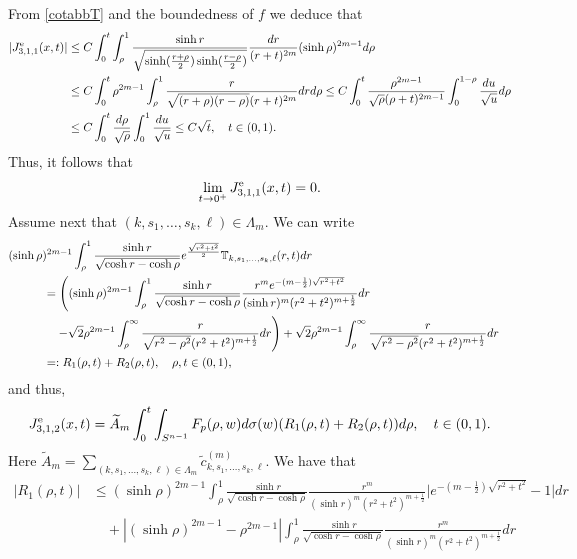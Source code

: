 \documentclass[a4paper,10pt, reqno]{amsart}
\theoremstyle{definition}
\theoremstyle{remark}
\numberwithin{equation}{section}
\begin{document}
{From \eqref{cotabbT} and the boundedness of $f$ we deduce that
\begin{align}\label{J311even}
    |J_{3,1,1}^{\rm e}(x,t)|&\leq C\int_0^t\int_\rho ^1\frac{\sinh r}{\sqrt{\sinh (\frac{r+\rho}{2})\sinh(\frac{r-\rho}{2})}}\frac{dr}{(r+t)^{2m}}(\sinh \rho )^{2m-1}d\rho\nonumber\\
    &\leq C\int_0^t\rho ^{2m-1}\int_\rho ^1\frac{r}{\sqrt{(r+\rho)(r-\rho)}(r+t)^{2m}}drd\rho\leq C\int_0^t\frac{\rho ^{2m-1}}{\sqrt{\rho}(\rho +t)^{2m-1}}\int_0^{1-\rho}\frac{du}{\sqrt{u}}d\rho\nonumber\\
    &\leq C\int_0^t\frac{d\rho}{\sqrt{\rho}}\int_0^1\frac{du}{\sqrt{u}}\leq C\sqrt{t},\quad t\in (0,1).
\end{align}
Thus, it follows that
$$
\lim_{t\rightarrow 0^+}J_{3,1,1}^{\rm e}(x,t)=0.
$$
Assume next that $(k,s_1,\ldots, s_k,\ell )\in \Lambda _m$.  We can write
\begin{align}\label{K1K2}
(\sinh \rho )^{2m-1}\int_\rho ^1\frac{\sinh r}{\sqrt{\cosh r -\cosh \rho}}e^{\frac{\sqrt{r^2+t^2}}{2}}\mathbb T_{k,s_1,\ldots,s_k,\ell}(r, t)dr\nonumber\\
&\hspace{-8cm}=\left((\sinh \rho )^{2m-1}\int_\rho ^1\frac{\sinh r}{\sqrt{\cosh r -\cosh \rho}}\frac{r^me^{-(m-\frac{1}{2})\sqrt{r^2+t^2}}}{(\sinh r)^m(r^2+t^2)^{m+\frac{1}{2}}}dr\right.\nonumber\\
&\hspace{-8cm}\quad \left. -\sqrt{2}\rho ^{2m-1}\int_\rho ^\infty \frac{r}{\sqrt{r^2-\rho ^2}(r^2+t^2)^{m+\frac{1}{2}}}dr\right)+\sqrt{2}\rho ^{2m-1}\int_\rho ^\infty \frac{r}{\sqrt{r^2-\rho ^2}(r^2+t^2)^{m+\frac{1}{2}}}dr\nonumber\\
&\hspace{-8cm}=:R_1(\rho , t)+ R_2(\rho , t),\quad \rho ,t\in (0,1),
\end{align}
and thus,
$$
J_{3,1,2}^{\rm e}(x,t)=\widetilde{A}_m\int_0^t\int_{S^{n-1}}F_p(\rho ,w)d\sigma (w)(R_1(\rho , t)+R_2(\rho ,t ))d\rho,\quad t\in (0,1).
$$
Here $\widetilde{A}_m=\sum_{(k,s_1,\ldots,s_k,\ell)\in \Lambda_m}\widetilde{c}_{k,s_1,\ldots, s_k,\ell}^{(m)}$. We have that
\begin{align*}
    |R_1(\rho ,t)|&\leq (\sinh \rho )^{2m-1}\int_\rho ^1\frac{\sinh r}{\sqrt{\cosh r -\cosh \rho}}\frac{r^m}{(\sinh r)^m(r^2+t^2)^{m+\frac{1}{2}}}\big|e^{-(m-\frac{1}{2})\sqrt{r^2+t^2}}-1\big|dr\\
    &\quad +|(\sinh \rho )^{2m-1}-\rho ^{2m-1}|\int_\rho ^1\frac{\sinh r}{\sqrt{\cosh r -\cosh \rho}}\frac{r^m}{(\sinh r)^m(r^2+t^2)^{m+\frac{1}{2}}}dr\\

\end{align*}}
\end{document}
